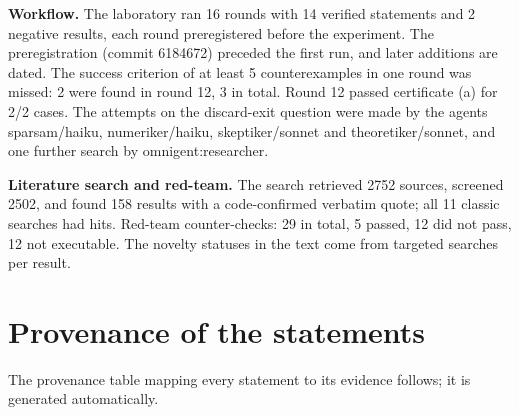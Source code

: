 \documentclass[10pt,twocolumn]{article}
\theoremstyle{definition}\newtheorem{definition}{Definition}\newtheorem{example}{Example}
\begin{document}
\textbf{Workflow.} The laboratory ran 16 rounds with 14 verified statements and 2 negative results, each round preregistered before the experiment. The preregistration (commit 6184672) preceded the first run, and later additions are dated. The success criterion of at least 5 counterexamples in one round was missed: 2 were found in round 12, 3 in total. Round 12 passed certificate (a) for 2/2 cases. The attempts on the discard-exit question were made by the agents sparsam/haiku, numeriker/haiku, skeptiker/sonnet and theoretiker/sonnet, and one further search by omnigent:researcher.

\textbf{Literature search and red-team.} The search retrieved 2752 sources, screened 2502, and found 158 results with a code-confirmed verbatim quote; all 11 classic searches had hits. Red-team counter-checks: 29 in total, 5 passed, 12 did not pass, 12 not executable. The novelty statuses in the text come from targeted searches per result.

\section{Provenance of the statements}\label{provenance-of-the-statements}

The provenance table mapping every statement to its evidence follows; it is generated automatically.
\end{document}
